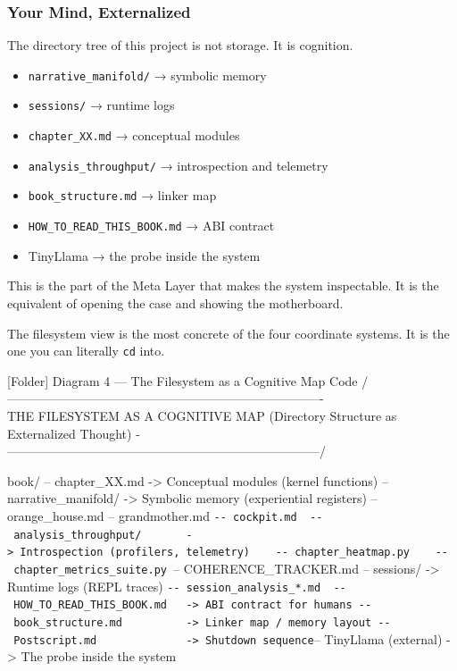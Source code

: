 \hypertarget{your-mind-externalized}{%
\subsubsection{Your Mind, Externalized}\label{your-mind-externalized}}

The directory tree of this project is not storage. It is cognition.

\begin{itemize}
\tightlist
\item
  \texttt{narrative\_manifold/} → symbolic memory
\item
  \texttt{sessions/} → runtime logs
\item
  \texttt{chapter\_XX.md} → conceptual modules
\item
  \texttt{analysis\_throughput/} → introspection and telemetry
\item
  \texttt{book\_structure.md} → linker map
\item
  \texttt{HOW\_TO\_READ\_THIS\_BOOK.md} → ABI contract
\item
  TinyLlama → the probe inside the system
\end{itemize}

This is the part of the Meta Layer that makes the system inspectable. It
is the equivalent of opening the case and showing the motherboard.

The filesystem view is the most concrete of the four coordinate systems.
It is the one you can literally \texttt{cd} into.

{[}Folder{]} Diagram 4 --- The Filesystem as a Cognitive Map Code
/----------------------------------------------------------------------------\\
\textbar{} THE FILESYSTEM AS A COGNITIVE MAP \textbar{} \textbar{}
(Directory Structure as Externalized Thought) \textbar{}
-\/---------------------------------------------------------------------------/

book/ \textbar{} \textbar-- chapter\_XX.md -\textgreater{} Conceptual
modules (kernel functions) \textbar{} \textbar-- narrative\_manifold/
-\textgreater{} Symbolic memory (experiential registers) \textbar{}
\textbar-- orange\_house.md \textbar{} \textbar-- grandmother.md
\textbar{}
\texttt{-\/-\ cockpit.md\ \textbar{}\ \textbar{}-\/-\ analysis\_throughput/\ \ \ \ \ \ \ -\textgreater{}\ Introspection\ (profilers,\ telemetry)\ \textbar{}\ \ \ \textbar{}-\/-\ chapter\_heatmap.py\ \textbar{}\ \ \ \textbar{}-\/-\ chapter\_metrics\_suite.py\ \textbar{}}--
COHERENCE\_TRACKER.md \textbar{} \textbar-- sessions/ -\textgreater{}
Runtime logs (REPL traces) \textbar{}
\texttt{-\/-\ session\_analysis\_*.md\ \textbar{}\ \textbar{}-\/-\ HOW\_TO\_READ\_THIS\_BOOK.md\ \ \ -\textgreater{}\ ABI\ contract\ for\ humans\ \textbar{}-\/-\ book\_structure.md\ \ \ \ \ \ \ \ \ \ -\textgreater{}\ Linker\ map\ /\ memory\ layout\ \textbar{}-\/-\ Postscript.md\ \ \ \ \ \ \ \ \ \ \ \ \ \ -\textgreater{}\ Shutdown\ sequence}--
TinyLlama (external) -\textgreater{} The probe inside the system

